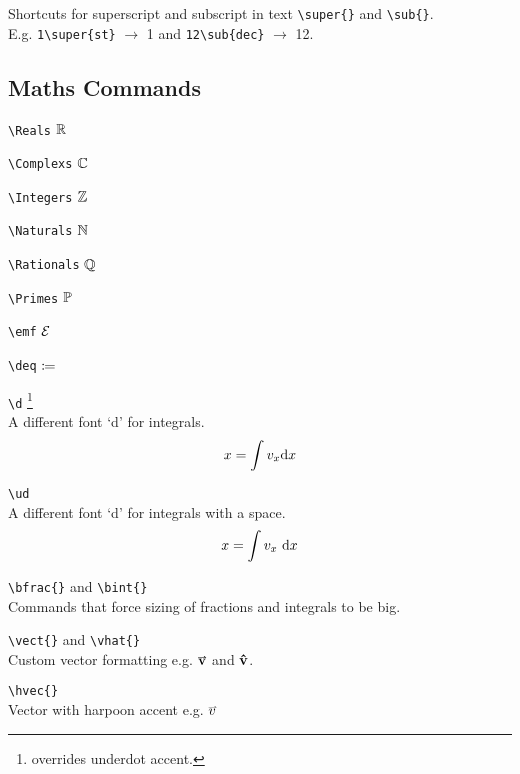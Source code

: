 \documentclass[Book Template.tex]{subfiles}
\begin{document}
                Shortcuts for superscript and subscript in text \verb+\super{}+ and \verb+\sub{}+.\\
                E.g. \verb+1\super{st}+ $\to$ 1 and \verb+12\sub{dec}+ $\to$ 12.


            \subsection{Maths Commands}
                \label{subsec: maths commands}

                \verb+\Reals+ $\mathbb{R}$
                
                \verb+\Complexs+ $\mathbb{C}$
                
                \verb+\Integers+ $\mathbb{Z}$
                
                \verb+\Naturals+ $\mathbb{N}$
                
                \verb+\Rationals+ $\mathbb{Q}$ 

                \verb+\Primes+ $\mathbb{P}$

                \verb+\emf+ $\mathcal{E}$

                \verb+\deq+ $\coloneqq$

                \verb+\d+ \footnote{overrides underdot accent.}\\
                A different font `d' for integrals.
                \begin{equation*}
                    x = \int v_x \mathrm{d} x
                \end{equation*}

                \verb+\ud+\\
                A different font `d' for integrals with a space.
                \begin{equation*}
                    x = \int v_x \ \mathrm{d} x
                \end{equation*}

                \verb+\bfrac{}+ and \verb+\bint{}+\\
                Commands that force sizing of fractions and integrals to be big.
                
                \verb+\vect{}+ and \verb+\vhat{}+\\
                Custom vector formatting e.g. $\vect{v}$ and $\boldsymbol{\mathbf{\hat{v}}}$.

                \verb+\hvec{}+\\
                Vector with harpoon accent e.g. $\hvec{v}$
\end{document}
